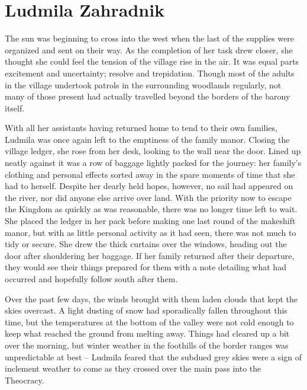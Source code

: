 \chapter{Ludmila Zahradnik}

The sun was beginning to cross into the west when the last of the supplies were organized and sent on their way. As the completion of her task drew closer, she thought she could feel the tension of the village rise in the air. It was equal parts excitement and uncertainty; resolve and trepidation. Though most of the adults in the village undertook patrols in the surrounding woodlands regularly, not many of those present had actually travelled beyond the borders of the barony itself.

 

With all her assistants having returned home to tend to their own families, Ludmila was once again left to the emptiness of the family manor. Closing the village ledger, she rose from her desk, looking to the wall near the door. Lined up neatly against it was a row of baggage lightly packed for the journey: her family’s clothing and personal effects sorted away in the spare moments of time that she had to herself. Despite her dearly held hopes, however, no sail had appeared on the river, nor did anyone else arrive over land. With the priority now to escape the Kingdom as quickly as was reasonable, there was no longer time left to wait. She placed the ledger in her pack before making one last round of the makeshift manor, but with as little personal activity as it had seen, there was not much to tidy or secure. She drew the thick curtains over the windows, heading out the door after shouldering her baggage. If her family returned after their departure, they would see their things prepared for them with a note detailing what had occurred and hopefully follow south after them.

 

Over the past few days, the winds brought with them laden clouds that kept the skies overcast. A light dusting of snow had sporadically fallen throughout this time, but the temperatures at the bottom of the valley were not cold enough to keep what reached the ground from melting away. Things had cleared up a bit over the morning, but winter weather in the foothills of the border ranges was unpredictable at best – Ludmila feared that the subdued grey skies were a sign of inclement weather to come as they crossed over the main pass into the Theocracy.

 

